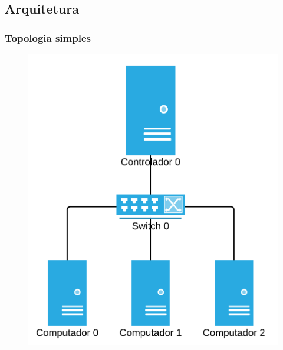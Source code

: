 \subsection{Arquitetura}


%
%
\begin{frame}\frametitle{Topologia simples}

	\begin{figure}[h]
        \centering
        \includegraphics[scale=.8]{images/simple-topology}
    \end{figure}
\end{frame}


